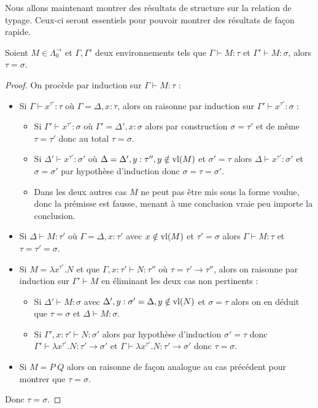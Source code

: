 Nous allons maintenant montrer des résultats de structure sur la relation de typage. Ceux-ci seront essentiels pour pouvoir montrer des résultats de façon rapide.

\begin{prop}
    Soient $M\in\Lambda_0^{\to}$ et $\Gamma,\Gamma'$ deux environnements tels que $\Gamma\vdash M : \tau$ et $\Gamma'\vdash M : \sigma$, alors $\tau = \sigma$.
\end{prop}

\begin{proof}
    On procède par induction sur $\Gamma\vdash M : \tau$ :
    \begin{itemize}[label=$\bullet$]
        \item Si $\Gamma\vdash x^{\tau'} : \tau$ où $\Gamma = \Delta,x : \tau$, alors on raisonne par induction sur $\Gamma'\vdash x^{\tau'} : \sigma$ :
        \begin{itemize}[label=$\bullet$]
            \item Si $\Gamma'\vdash x^{\tau'} : \sigma$ où $\Gamma' = \Delta', x : \sigma$ alors par construction $\sigma = \tau'$ et de même $\tau = \tau'$ donc au total $\tau = \sigma$.
            \item Si $\Delta'\vdash x^{\tau'} : \sigma'$ où $\Delta = \Delta',y : \tau'',y\notin\mathrm{vl}(M)$ et $\sigma' = \tau$ alors $\Delta \vdash x^{\tau'} : \sigma'$ et $\sigma = \sigma'$ par hypothèse d'induction donc $\sigma = \tau = \sigma'$.
            \item Dans les deux autres cas $M$ ne peut pas être mis sous la forme voulue, donc la prémisse est fausse, menant à une conclusion vraie peu importe la conclusion.
        \end{itemize}
        \item Si $\Delta\vdash M : \tau'$ où $\Gamma = \Delta,x : \tau'$ avec $x\notin\mathrm{vl}(M)$ et $\tau' = \sigma$ alors $\Gamma\vdash M : \tau$ et $\tau = \tau' = \sigma$.
        \item Si $M = \lambda x^{\tau'}.N$ et que $\Gamma,x : \tau' \vdash N : \tau''$ où $\tau = \tau'\to\tau''$, alors on raisonne par induction sur $\Gamma'\vdash M$ en éliminant les deux cas non pertinents :
        \begin{itemize}[label=$\bullet$]
            \item Si $\Delta'\vdash M :\sigma$ avec $\Delta',y : \sigma' = \Delta, y \notin\mathrm{vl}(N)$ et $\sigma = \tau$ alors on en déduit que $\tau = \sigma$ et $\Delta\vdash M : \sigma$.
            \item Si $\Gamma', x : \tau'\vdash N : \sigma'$ alors par hypothèse d'induction $\sigma' = \tau$ donc $\Gamma'\vdash \lambda x^{\tau'}. N :\tau'\to\sigma'$ et $\Gamma\vdash \lambda x^{\tau'}.N : \tau'\to\sigma'$ donc $\tau = \sigma$.
        \end{itemize}
        \item Si $M = P\;Q$ alors on raisonne de façon analogue au cas précédent pour montrer que $\tau = \sigma$.
    \end{itemize}
    Donc $\tau = \sigma$.
\end{proof}

